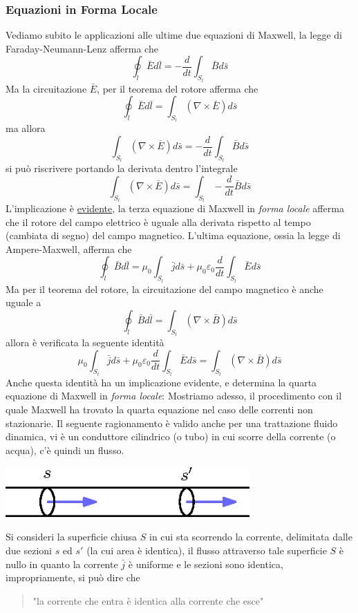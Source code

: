 \documentclass[10pt, letterpaper]{report}
\begin{document}
\subsubsection{Equazioni in Forma Locale}
Vediamo subito le applicazioni alle ultime due equazioni di Maxwell, la legge di Faraday-Neumann-Lenz afferma che 
$$ \oint_l \bar E d\bar l = -\frac{d}{dt}\int_{S_l}\bar B d\bar s$$
Ma la circuitazione $\bar E$, per il teorema del rotore afferma che 
$$ \oint_l \bar E d\bar l = \int_{S_l}(\nabla \times \bar E)d\bar s$$
ma allora 
$$\int_{S_l}(\nabla \times \bar E)d\bar s=-\frac{d}{dt}\int_{S_l}\bar B d\bar s$$
si può riscrivere portando la derivata dentro l'integrale 
$$\int_{S_l}(\nabla \times \bar E)d\bar s=\int_{S_l}-\frac{d}{dt}\bar B d\bar s$$
L'implicazione è \underline{evidente}, la terza equazione di Maxwell in \textit{forma locale} afferma che il rotore del campo elettrico è uguale alla derivata rispetto al tempo (cambiata di segno) del campo magnetico.
L'ultima equazione, ossia la legge di Ampere-Maxwell, afferma che 
$$\oint_l \bar B d\bar l = \mu_0\int_{S_l}\bar j d\bar s+\mu_0\varepsilon_0\frac{d}{dt}\int_{S_l}\bar E d\bar s
$$
Ma per il teorema del rotore, la circuitazione del campo magnetico è anche uguale a
$$\oint_l \bar B d\bar l = \int_{S_l}(\nabla \times \bar B)d\bar s$$
allora è verificata la seguente identità 
$$ \mu_0\int_{S_l}\bar j d\bar s+\mu_0\varepsilon_0\frac{d}{dt}\int_{S_l}\bar E d\bar s=\int_{S_l}(\nabla \times \bar B)d\bar s$$
Anche questa identità ha un implicazione evidente, e determina la quarta equazione di Maxwell in \textit{forma locale}: 
Mostriamo adesso, il procedimento con il quale Maxwell ha trovato la quarta equazione nel caso delle correnti non stazionarie. Il seguente ragionamento è valido anche per una trattazione fluido dinamica, vi è un conduttore cilindrico (o tubo) in cui scorre della corrente (o acqua), c'è quindi un flusso.\begin{center}
    \includegraphics[width=0.7\textwidth]{images/4eqMax.eps}
\end{center}
Si consideri la superficie chiusa $S$ in cui sta scorrendo la corrente, delimitata dalle due sezioni $s$ ed $s'$ (la cui area è identica), il flusso attraverso tale superficie $S$ è nullo in quanto la corrente $\bar j$ è uniforme e le sezioni sono identica, impropriamente, si può dire che \begin{quote}
    "la corrente che entra è identica alla corrente che esce"
\end{quote}
\end{document}
